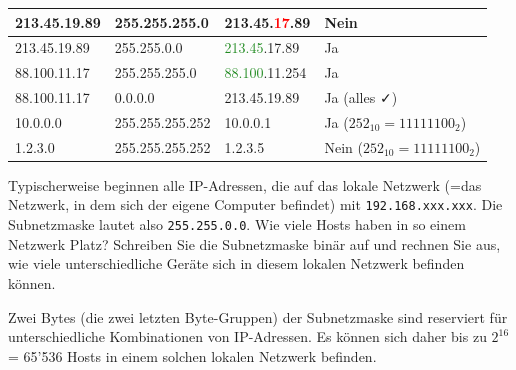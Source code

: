 \begin{myexercise}
\begin{myanswer}
\begin{table}[H]
\begin{tabular}{l|l|l|l}
				213.45.19.89       & 255.255.255.0      & 213.45.\textcolor{red}{17}.89          & Nein                           \\\midrule

				213.45.19.89       & 255.255.0.0        & \textcolor{ForestGreen}{213.45}.17.89  & Ja                             \\\midrule

				88.100.11.17       & 255.255.255.0      & \textcolor{ForestGreen}{88.100}.11.254 & Ja                             \\\midrule

				88.100.11.17       & 0.0.0.0            & 213.45.19.89                           & Ja (alles \faCheck)            \\\midrule

				10.0.0.0           & 255.255.255.252    & 10.0.0.1                               & Ja ($252_{10}=11111100_{2}$)   \\\midrule
				1.2.3.0            & 255.255.255.252    & 1.2.3.5                                & Nein ($252_{10}=11111100_{2}$)
			\end{tabular}
		\end{table}
	\end{myanswer}
\end{myexercise}

\begin{myexercise}
	Typischerweise beginnen alle \gls{IP}-Adressen, die auf das lokale Netzwerk (=das Netzwerk, in dem sich der eigene Computer befindet) mit \texttt{192.168.xxx.xxx}. Die Subnetzmaske lautet also \texttt{255.255.0.0}. Wie viele Hosts haben in so einem Netzwerk Platz? Schreiben Sie die Subnetzmaske binär auf und rechnen Sie aus, wie viele unterschiedliche Geräte sich in diesem lokalen Netzwerk befinden können.
	\begin{myanswer}
		Zwei Bytes (die zwei letzten Byte-Gruppen) der Subnetzmaske sind reserviert für unterschiedliche Kombinationen von \gls{IP}-Adressen. Es können sich daher bis zu $2^{16}$ = 65'536 Hosts in einem solchen lokalen Netzwerk befinden.
	\end{myanswer}
\end{myexercise}

